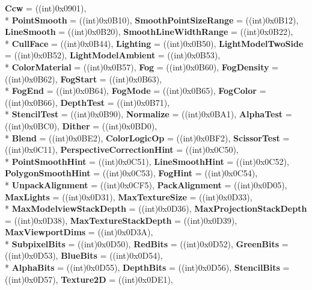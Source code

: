 \begin{DoxyCompactItemize}
{\bfseries Ccw} = ((int)0x0901), 
\\*
{\bfseries Point\-Smooth} = ((int)0x0\-B10), 
{\bfseries Smooth\-Point\-Size\-Range} = ((int)0x0\-B12), 
{\bfseries Line\-Smooth} = ((int)0x0\-B20), 
{\bfseries Smooth\-Line\-Width\-Range} = ((int)0x0\-B22), 
\\*
{\bfseries Cull\-Face} = ((int)0x0\-B44), 
{\bfseries Lighting} = ((int)0x0\-B50), 
{\bfseries Light\-Model\-Two\-Side} = ((int)0x0\-B52), 
{\bfseries Light\-Model\-Ambient} = ((int)0x0\-B53), 
\\*
{\bfseries Color\-Material} = ((int)0x0\-B57), 
{\bfseries Fog} = ((int)0x0\-B60), 
{\bfseries Fog\-Density} = ((int)0x0\-B62), 
{\bfseries Fog\-Start} = ((int)0x0\-B63), 
\\*
{\bfseries Fog\-End} = ((int)0x0\-B64), 
{\bfseries Fog\-Mode} = ((int)0x0\-B65), 
{\bfseries Fog\-Color} = ((int)0x0\-B66), 
{\bfseries Depth\-Test} = ((int)0x0\-B71), 
\\*
{\bfseries Stencil\-Test} = ((int)0x0\-B90), 
{\bfseries Normalize} = ((int)0x0\-B\-A1), 
{\bfseries Alpha\-Test} = ((int)0x0\-B\-C0), 
{\bfseries Dither} = ((int)0x0\-B\-D0), 
\\*
{\bfseries Blend} = ((int)0x0\-B\-E2), 
{\bfseries Color\-Logic\-Op} = ((int)0x0\-B\-F2), 
{\bfseries Scissor\-Test} = ((int)0x0\-C11), 
{\bfseries Perspective\-Correction\-Hint} = ((int)0x0\-C50), 
\\*
{\bfseries Point\-Smooth\-Hint} = ((int)0x0\-C51), 
{\bfseries Line\-Smooth\-Hint} = ((int)0x0\-C52), 
{\bfseries Polygon\-Smooth\-Hint} = ((int)0x0\-C53), 
{\bfseries Fog\-Hint} = ((int)0x0\-C54), 
\\*
{\bfseries Unpack\-Alignment} = ((int)0x0\-C\-F5), 
{\bfseries Pack\-Alignment} = ((int)0x0\-D05), 
{\bfseries Max\-Lights} = ((int)0x0\-D31), 
{\bfseries Max\-Texture\-Size} = ((int)0x0\-D33), 
\\*
{\bfseries Max\-Modelview\-Stack\-Depth} = ((int)0x0\-D36), 
{\bfseries Max\-Projection\-Stack\-Depth} = ((int)0x0\-D38), 
{\bfseries Max\-Texture\-Stack\-Depth} = ((int)0x0\-D39), 
{\bfseries Max\-Viewport\-Dims} = ((int)0x0\-D3\-A), 
\\*
{\bfseries Subpixel\-Bits} = ((int)0x0\-D50), 
{\bfseries Red\-Bits} = ((int)0x0\-D52), 
{\bfseries Green\-Bits} = ((int)0x0\-D53), 
{\bfseries Blue\-Bits} = ((int)0x0\-D54), 
\\*
{\bfseries Alpha\-Bits} = ((int)0x0\-D55), 
{\bfseries Depth\-Bits} = ((int)0x0\-D56), 
{\bfseries Stencil\-Bits} = ((int)0x0\-D57), 
{\bfseries Texture2\-D} = ((int)0x0\-D\-E1), 

\end{DoxyCompactItemize}
